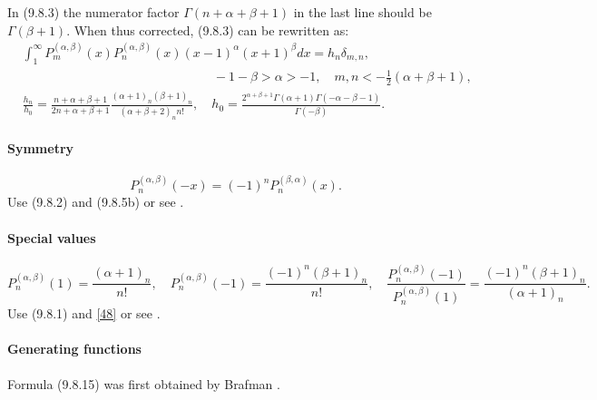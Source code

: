 \documentclass[twoside,11pt]{article}
\newcommand\al\alpha
\newcommand\be\beta
\newcommand\de\delta
\newcommand\Ga{\Gamma}
\newcommand\thalf{\tfrac12}
\newcommand\iy\infty
\begin{document}
In (9.8.3) the numerator factor $\Ga(n+\al+\be+1)$ in the last line should be
$\Ga(\be+1)$. When thus corrected, (9.8.3) can be rewritten as:
\begin{equation}
\begin{split}
&\int_1^\iy P_m^{(\al,\be)}(x) P_n^{(\al,\be)}(x) (x-1)^\al (x+1)^\be dx=h_n \de_{m,n} ,\\
&\qquad\qquad\qquad\qquad\qquad\qquad\qquad\quad-1-\be>\al>-1,\quad m,n<-\thalf(\al+\be+1),\\
&\frac{h_n}{h_0}=
\frac{n+\al+\be+1}{2n+\al+\be+1} 
\frac{(\al+1)_n(\be+1)_n}{(\al+\be+2)_n n!} ,\quad
h_0=\frac{2^{\al+\be+1}\Ga(\al+1)\Ga(-\al-\be-1)}{\Ga(-\be)} .
\end{split}
\label{122}
\end{equation}

%
\paragraph{Symmetry}
\begin{equation}
P_n^{(\al,\be)}(-x)=(-1)^n P_n^{(\be,\al)}(x).
\label{48}
\end{equation}
Use (9.8.2) and (9.8.5b) or see .
%
\paragraph{Special values}
\begin{equation}
P_n^{(\al,\be)}(1)=\frac{(\al+1)_n}{n!} ,\quad
P_n^{(\al,\be)}(-1)=\frac{(-1)^n(\be+1)_n}{n!} ,\quad
\frac{P_n^{(\al,\be)}(-1)}{P_n^{(\al,\be)}(1)}=\frac{(-1)^n(\be+1)_n}{(\al+1)_n} .
\label{50}
\end{equation}
Use (9.8.1) and \eqref{48} or see .
%
\paragraph{Generating functions}
Formula (9.8.15) was first obtained by Brafman .
%
\end{document}
